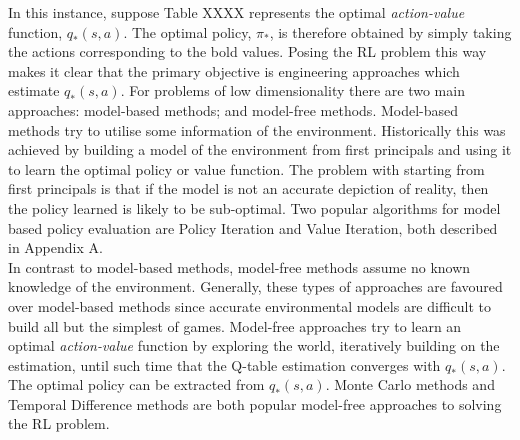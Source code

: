 \documentclass[a4paper]{article}
\begin{document}
\vspace{0.5cm}

In this instance, suppose Table XXXX represents the optimal \textit{action-value} function, $q_*(s,a)$. The optimal policy, $\pi_*$, is therefore obtained by simply taking the actions corresponding to the bold values. Posing the RL problem this way makes it clear that the primary objective is engineering approaches which estimate $q_*(s,a)$. For problems of low dimensionality there are two main approaches: model-based methods; and model-free methods. Model-based methods try to utilise some information of the environment. Historically this was achieved by building a model of the environment from first principals and using it to learn the optimal policy or value function. The problem with starting from first principals is that if the model is not an accurate depiction of reality, then the policy learned is likely to be sub-optimal. Two popular algorithms for model based policy evaluation are Policy Iteration and Value Iteration, both described in Appendix A.\\

In contrast to model-based methods, model-free methods assume no known knowledge of the environment. Generally, these types of approaches are favoured over model-based methods since accurate environmental models are difficult to build all but the simplest of games. Model-free approaches try to learn an optimal \textit{action-value} function by exploring the world, iteratively building on the estimation, until such time that the Q-table estimation converges with $q_*(s,a)$. The optimal policy can be extracted from $q_*(s,a)$. Monte Carlo methods and Temporal Difference methods are both popular model-free approaches to solving the RL problem.
\end{document}
